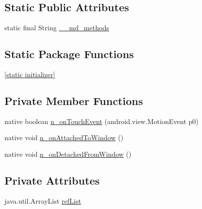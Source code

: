 \subsection*{Static Public Attributes}
\begin{CompactItemize}
\item 
static final String \hyperlink{classmd5b60ffeb829f638581ab2bb9b1a7f4f3f_1_1_page_renderer_ae4f94a2ae5f7a20817732bf98264a0a}{\_\-\_\-md\_\-methods}
\end{CompactItemize}
\subsection*{Static Package Functions}
\begin{CompactItemize}
\item 
\hyperlink{classmd5b60ffeb829f638581ab2bb9b1a7f4f3f_1_1_page_renderer_2f982e94f2717d053a64b84bfc473ebe}{\mbox{[}static initializer\mbox{]}}
\end{CompactItemize}
\subsection*{Private Member Functions}
\begin{CompactItemize}
\item 
native boolean \hyperlink{classmd5b60ffeb829f638581ab2bb9b1a7f4f3f_1_1_page_renderer_e06757e6f6dff9d51c3f4846c4ccae1f}{n\_\-onTouchEvent} (android.view.MotionEvent p0)
\item 
native void \hyperlink{classmd5b60ffeb829f638581ab2bb9b1a7f4f3f_1_1_page_renderer_4eec70029c094a9d58a5dc091fef3ebf}{n\_\-onAttachedToWindow} ()
\item 
native void \hyperlink{classmd5b60ffeb829f638581ab2bb9b1a7f4f3f_1_1_page_renderer_940e352be04c4028a06fcdb63e29ed52}{n\_\-onDetachedFromWindow} ()
\end{CompactItemize}
\subsection*{Private Attributes}
\begin{CompactItemize}
\item 
java.util.ArrayList \hyperlink{classmd5b60ffeb829f638581ab2bb9b1a7f4f3f_1_1_page_renderer_ac99f9c10a815f0767bf3b6697ebb44a}{refList}
\end{CompactItemize}


